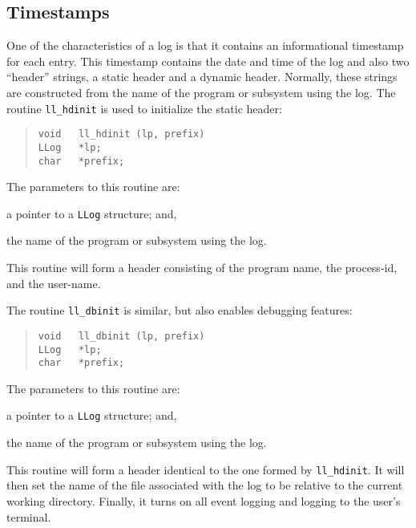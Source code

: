 \subsection	{Timestamps}
One of the characteristics of a log is that it contains an informational
timestamp for each entry.
This timestamp contains the date and time of the log and also two ``header''
strings, a static header and a dynamic header.
Normally, these strings are constructed from the name of the program or
subsystem using the log.
The routine \verb"ll_hdinit" is used to initialize the static header:
\begin{quote}\small\begin{verbatim}
void   ll_hdinit (lp, prefix)
LLog   *lp;
char   *prefix;
\end{verbatim}\end{quote}
The parameters to this routine are:
\begin{describe}
\item[\verb"lp":] a pointer to a \verb"LLog" structure; and,

\item[\verb"prefix":] the name of the program or subsystem using the log.
\end{describe}
This routine will form a header consisting of the program name,
the process-id, and the user-name.

The routine \verb"ll_dbinit" is similar, but also enables debugging features:
\begin{quote}\small\begin{verbatim}
void   ll_dbinit (lp, prefix)
LLog   *lp;
char   *prefix;
\end{verbatim}\end{quote}
The parameters to this routine are:
\begin{describe}
\item[\verb"lp":] a pointer to a \verb"LLog" structure; and,

\item[\verb"prefix":] the name of the program or subsystem using the log.
\end{describe}
This routine will form a header identical to the one formed by
\verb"ll_hdinit".
It will then set the name of the file associated with the log to be relative
to the current working directory.
Finally, it turns on all event logging and logging to the user's terminal.

